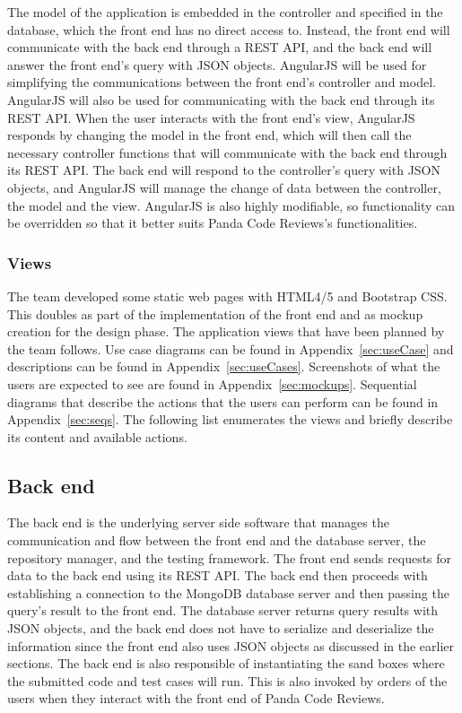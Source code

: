 The model of the application is embedded in the controller and specified in the
database, which the front end has no direct access to. Instead, the front end
will communicate with the back end through a REST API, and the back end will
answer the front end's query with JSON objects. AngularJS will be used for
simplifying the communications between the front end's controller and model.
AngularJS will also be used for communicating with the back end through its REST
API. When the user interacts with the front end's view, AngularJS responds by
changing the model in the front end, which will then call the necessary
controller functions that will communicate with the back end through its REST
API. The back end will respond to the controller's query with JSON objects, and
AngularJS will manage the change of data between the controller, the model and
the view. AngularJS is also highly modifiable, so functionality can be
overridden so that it better suits Panda Code Reviews's functionalities.

\subsubsection{Views}

The team developed some static web pages with
HTML4/5 and Bootstrap CSS. This doubles as part of the implementation of the
front end and as mockup creation for the design phase. The application views
that have been planned by the team follows. Use case diagrams can be found in
Appendix~\ref{sec:useCase} and descriptions can be found in
Appendix~\ref{sec:useCases}. Screenshots of what the users are expected to see
are found in Appendix~\ref{sec:mockups}. Sequential diagrams that describe the
actions that the users can perform can be found in Appendix~\ref{sec:seqs}. The
following list enumerates the views and briefly describe its content and
available actions.

\subsection{Back end}

The back end is the underlying server side software that manages the
communication and flow between the front end and the database server, the
repository manager, and the testing framework. The front end sends requests for
data to the back end using its REST API. The back end then proceeds with
establishing a connection to the MongoDB\cite{mongodb} database server and then
passing the query's result to the front end. The database server returns query
results with JSON objects, and the back end does not have to serialize and
deserialize the information since the front end also uses JSON objects as
discussed in the earlier sections. The back end is also responsible of
instantiating the sand boxes where the submitted code and test cases will run.
This is also invoked by orders of the users when they interact with the front
end of Panda Code Reviews.

